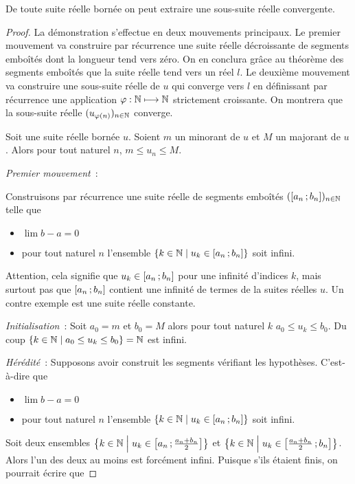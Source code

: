 \begin{theo}
  De toute suite réelle bornée on peut extraire une sous-suite réelle convergente.
\end{theo}
\begin{proof}
 La démonstration s'effectue en deux mouvements principaux. Le premier mouvement va construire par récurrence une suite réelle décroissante de segments emboîtés dont la longueur tend vers zéro. On en conclura grâce au théorème des segments emboîtés que la suite réelle tend vers un réel $l$. Le deuxième mouvement va construire une sous-suite réelle de $u$ qui converge vers $l$ en définissant par récurrence une application $\varphi : \mathbb{N} \longmapsto \mathbb{N}$ strictement croissante. On montrera que la sous-suite réelle $(u_{\varphi(n)})_{n \in \mathbb{N}}$ converge.

 Soit une suite réelle bornée $u$. Soient $m$ un minorant de $u$ et $M$ un majorant de $u$. Alors pour tout naturel $n$, $m \leq u_n \leq M$.

\emph{Premier mouvement}~:

Construisons par récurrence une suite réelle de segments emboîtés $(\left[ a_n \, ;  b_n \right])_{n \in \mathbb{N}}$ telle que
\begin{itemize}
\item $\lim b-a =0$
\item pour tout naturel $n$ l'ensemble $\left\{k \in \mathbb{N}\mathrel{}\middle|\mathrel{}u_k \in \left[ a_n \, ;  b_n \right]\right\}$ soit infini.
\end{itemize}

Attention, cela signifie que $u_k \in \left[ a_n \, ;  b_n \right]$ pour une infinité d'indices $k$, mais surtout pas que $\left[ a_n \, ;  b_n \right]$ contient une infinité de termes de la suites réelles $u$. Un contre exemple est une suite réelle constante.

\emph{Initialisation}~: Soit $a_0=m$ et $b_0=M$ alors pour tout naturel $k$ $a_0 \leq u_k \leq b_0$. Du coup $\left\{k \in \mathbb{N}\mathrel{}\middle|\mathrel{}a_0 \leq u_k \leq b_0\right\}=\mathbb{N}$ est infini.

\emph{Hérédité}~: Supposons avoir construit les segments vérifiant les hypothèses. C'est-à-dire que
\begin{itemize}
\item $\lim b-a =0$
\item pour tout naturel $n$ l'ensemble $\left\{k \in \mathbb{N}\mathrel{}\middle|\mathrel{}u_k \in \left[ a_n \, ;  b_n \right]\right\}$ soit infini.
\end{itemize}

Soit deux ensembles $\left\{k \in \mathbb{N}\mathrel{}\middle|\mathrel{}u_k \in \left[ a_n \, ;  \frac{a_n+b_n}{2} \right]\right\}$ et $\left\{k \in \mathbb{N}\mathrel{}\middle|\mathrel{}u_k \in \left[ \frac{a_n+b_n}{2} \, ;  b_n \right]\right\}$. Alors l'un des deux au moins est forcément infini. Puisque s'ils étaient finis, on pourrait écrire que


\end{proof}
